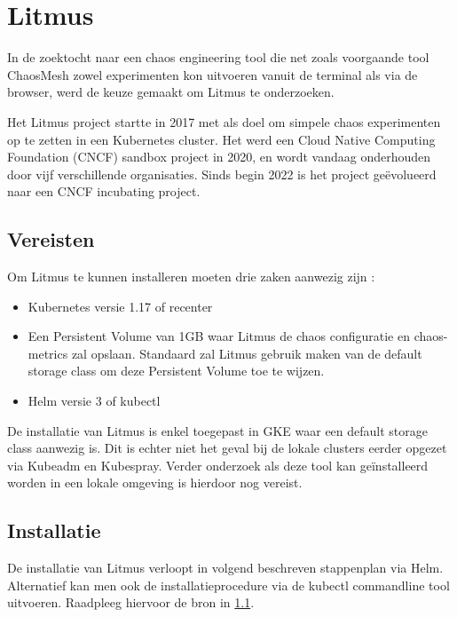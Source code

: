 \section{Litmus}

In de zoektocht naar een chaos engineering tool die net zoals voorgaande tool ChaosMesh zowel experimenten kon uitvoeren vanuit de terminal als via de browser, werd de keuze gemaakt om Litmus te onderzoeken. 

Het Litmus project startte in 2017 met als doel om simpele chaos experimenten op te zetten in een Kubernetes cluster. Het werd een Cloud Native Computing Foundation (CNCF) sandbox project in 2020, en wordt vandaag onderhouden door vijf verschillende organisaties. Sinds begin 2022 is het project geëvolueerd naar een CNCF incubating project. \autocite{CNCF2022}

\subsection {Vereisten}
\label{sec:litmusvereisten}

Om Litmus te kunnen installeren moeten drie zaken aanwezig zijn \autocite{Litmus2022}: 
\begin{itemize}
    \item Kubernetes versie 1.17 of recenter
    \item Een Persistent Volume van 1GB waar Litmus de chaos configuratie en chaos-metrics zal opslaan. Standaard zal Litmus gebruik maken van de default storage class om deze Persistent Volume toe te wijzen.
    \item Helm versie 3 of kubectl 
\end{itemize}

De installatie van Litmus is enkel toegepast in GKE waar een default storage class aanwezig is. Dit is echter niet het geval bij de lokale clusters eerder opgezet via Kubeadm en Kubespray. Verder onderzoek als deze tool kan geïnstalleerd worden in een lokale omgeving is hierdoor nog vereist. 

\subsection{Installatie}

De installatie van Litmus verloopt in volgend beschreven stappenplan via Helm. Alternatief kan men ook de installatieprocedure via de kubectl commandline tool uitvoeren. Raadpleeg hiervoor de bron in \ref{sec:litmusvereisten}.   

